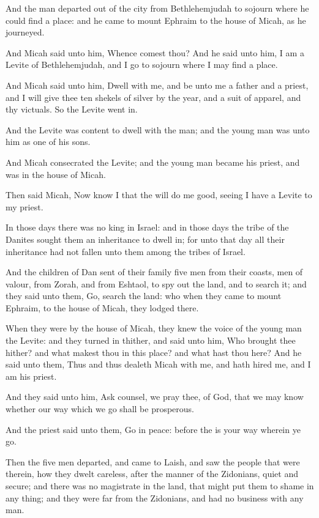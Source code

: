 \Verse And the man departed out of the city from Bethlehemjudah to sojourn where he could find a place: and he came to mount Ephraim to the house of Micah, as he journeyed.

\Verse And Micah said unto him, Whence comest thou? And he said unto him, I am a Levite of Bethlehemjudah, and I go to sojourn where I may find a place.

\Verse And Micah said unto him, Dwell with me, and be unto me a father and a priest, and I will give thee ten shekels of silver by the year, and a suit of apparel, and thy victuals. So the Levite went in.

\Verse And the Levite was content to dwell with the man; and the young man was unto him as one of his sons.

\Verse And Micah consecrated the Levite; and the young man became his priest, and was in the house of Micah.

\Verse Then said Micah, Now know I that the \LORD will do me good, seeing I have a Levite to my priest.


\Chapter
\Verse In those days there was no king in Israel: and in those days the tribe of the Danites sought them an inheritance to dwell in; for unto that day all their inheritance had not fallen unto them among the tribes of Israel.

\Verse And the children of Dan sent of their family five men from their coasts, men of valour, from Zorah, and from Eshtaol, to spy out the land, and to search it; and they said unto them, Go, search the land: who when they came to mount Ephraim, to the house of Micah, they lodged there.

\Verse When they were by the house of Micah, they knew the voice of the young man the Levite: and they turned in thither, and said unto him, Who brought thee hither? and what makest thou in this place? and what hast thou here?  \Verse And he said unto them, Thus and thus dealeth Micah with me, and hath hired me, and I am his priest.

\Verse And they said unto him, Ask counsel, we pray thee, of God, that we may know whether our way which we go shall be prosperous.

\Verse And the priest said unto them, Go in peace: before the \LORD is your way wherein ye go.

\Verse Then the five men departed, and came to Laish, and saw the people that were therein, how they dwelt careless, after the manner of the Zidonians, quiet and secure; and there was no magistrate in the land, that might put them to shame in any thing; and they were far from the Zidonians, and had no business with any man.

